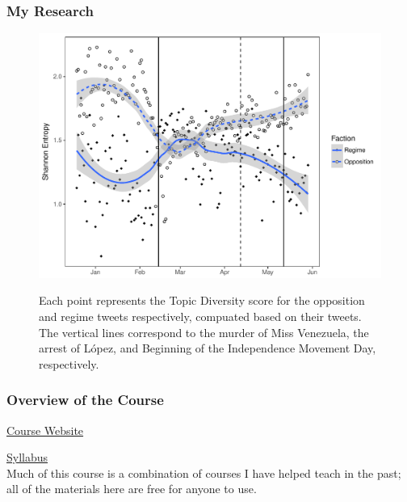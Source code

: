 \documentclass{beamer}
\begin{document}
\begin{frame}
	\frametitle{My Research}
		
		\begin{figure}
			
			
			\includegraphics[scale=.5]{figures/fig3.pdf} \\
			\raggedright{\small{Each point represents the Topic Diversity score for the opposition and regime tweets respectively, compuated based on their tweets. The vertical lines correspond to the murder of Miss Venezuela, the arrest of L\'{o}pez, and Beginning of the Independence Movement Day, respectively. }}
			
		\end{figure}
\end{frame}	






\begin{frame}
	\frametitle{Overview of the Course}
	
	\href{https://github.com/kmunger/Intro\_Data\_Science\_Rosario}{Course Website}\\ \pause 
	
	\href{https://github.com/kmunger/Intro_Data_Science_Rosario/blob/master/syllabus.pdf}{Syllabus}\\
	
	Much of this course is a combination of courses I have helped teach in the past; all of the materials here are free for anyone to use.
\end{frame}	
\end{document}
